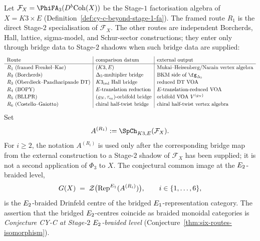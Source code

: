 \begin{conjecture}
\label{thm:cy-c-beyond-six-routes-as-stage-2-specialisations}
\ClaimStatusConjectured
Let $\mathcal F_X = \PhiFA_3(D^b\Coh(X))$ be the Stage-$1$
factorisation algebra of $X = K3 \times E$
(Definition~\ref{def:cy-c-beyond-stage-1-fa}). The framed route $R_1$
is the direct Stage-$2$ specialisation of $\mathcal F_X$. The other
routes are independent Borcherds, Hall, lattice, sigma-model, and
Schur-sector constructions; they enter only through bridge data to
Stage-$2$ shadows when such bridge data are supplied:
\[
\renewcommand{\arraystretch}{1.15}
\begin{array}{l|l|l}
 \text{Route} & \text{comparison datum} & \text{external output} \\\hline
 R_1 \text{ (framed Frenkel--Kac)} & (K3, E) & \text{Mukai--Heisenberg/Narain vertex algebra} \\
 R_2 \text{ (Borcherds)} & \Delta_5\text{-multiplier bridge} & \text{BKM side of } \fg_{\Delta_5} \\
 R_3 \text{ (Oberdieck--Pandharipande DT)} & K3_{\mathrm{red}}\text{ Hall bridge} & \text{reduced DT VOA} \\
 R_4 \text{ (BOPY)} & E\text{-translation reduction} & E\text{-translation-reduced VOA} \\
 R_5 \text{ (BLLPR)} & (g_N,\tau_{e_0})\text{-orbifold bridge} & \text{orbifold VOA } V^{(g_N)} \\
 R_6 \text{ (Costello--Gaiotto)} & \text{chiral half-twist bridge} & \text{chiral half-twist vertex algebra}
\end{array}
\]
Set
\[
 A^{(R_1)}:=\SpCh_{K3,E}(\mathcal F_X).
\]
For $i\geq2$, the notation $A^{(R_i)}$ is used only after the
corresponding bridge map from the external construction to a Stage-$2$
shadow of $\mathcal F_X$ has been supplied; it is not a second
application of $\Phi_3$ to $X$. The conjectural common image at the
$E_{2}$-braided level,
\[
 G(X) \;=\;
 \mathcal Z\bigl( \mathrm{Rep}^{E_{1}}(A^{(R_i)}) \bigr),
 \qquad i \in \{1, \ldots, 6\},
\]
is the $E_{2}$-braided Drinfeld centre of the bridged
$E_{1}$-representation category. The assertion that the bridged
$E_{2}$-centres coincide as braided monoidal categories is
\emph{Conjecture CY-C at Stage-$2$ $E_{2}$-braided level}
(Conjecture~\ref{thm:six-routes-isomorphism}).
\end{conjecture}

